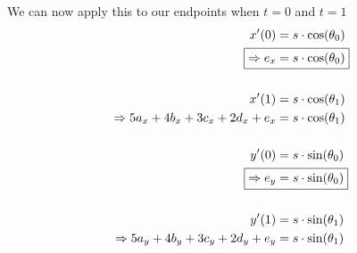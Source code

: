\documentclass[12pt, letterpaper]{article}
\begin{document}
We can now apply this to our endpoints when \(t = 0\) and \(t = 1\) 
\begin{align}
x'(0) &= s \cdot \cos(\theta_0) \nonumber \\
\Aboxed{\Rightarrow e_x &= s \cdot \cos(\theta_0)} \\
\nonumber \\
x'(1) &= s \cdot \cos(\theta_1) \nonumber \\
\Rightarrow 5a_x + 4b_x + 3c_x + 2d_x + e_x &= s \cdot \cos(\theta_1) \\
\nonumber \\
y'(0) &= s \cdot \sin(\theta_0) \nonumber \\
\Aboxed{\Rightarrow e_y &= s \cdot \sin(\theta_0)} \\
\nonumber \\
y'(1) &= s \cdot \sin(\theta_1) \nonumber \\
\Rightarrow 5a_y + 4b_y + 3c_y + 2d_y + e_y &= s \cdot \sin(\theta_1)
\end{align}
\end{document}
